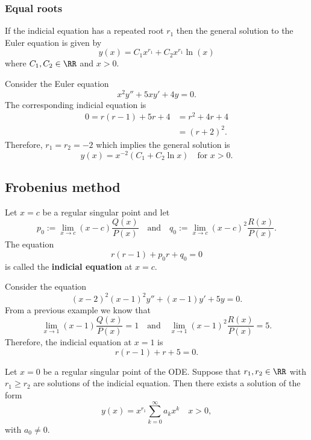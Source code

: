 \documentclass[12pt, a4paper]{article}
\begin{document}
\subsubsection{Equal roots}

\begin{mdthm}
    If the indicial equation has a repeated root \(r_1\) then the general solution to the Euler equation is given by
    \[y(x)=C_1 x^{r_1}+C_2 x^{r_1} \ln(x)\]
    where \(C_1,C_2 \in \RR\) and \(x>0\).
\end{mdthm}

\begin{example}
    Consider the Euler equation 
    \[x^2y''+5xy'+4y=0.\]
    The corresponding indicial equation is 
    \[\begin{aligned}
        0= r(r-1)+5r+4 &= r^2+4r+4 \\
        &= (r+2)^2.
    \end{aligned}\]
    Therefore, \(r_1=r_2=-2\) which implies the general solution is 
    \[y(x)=x^{-2}(C_1+C_2\ln x) \quad \text{for } x>0.\]
\end{example}

\subsection{Frobenius method}

\begin{definition}
    Let \(x=c\) be a regular singular point and let 
    \[p_0 := \lim_{x\to c}(x-c) \frac{Q(x)}{P(x)} \quad \text{and} \quad q_0:= \lim_{x\to c}(x-c)^2 \frac{R(x)}{P(x)}.\]
    The equation 
    \[r(r-1)+p_0r+q_0=0\]
    is called the \textbf{indicial equation} at \(x=c\).
\end{definition}

\begin{example}
    Consider the equation
    \[(x-2)^2(x-1)^2y''+(x-1)y'+5y=0.\]
    From a previous example we know that 
    \[\lim_{x \to 1}(x-1)\frac{Q(x)}{P(x)} =1 \quad \text{and} \quad \lim_{x\to 1} (x-1)^2\frac{R(x)}{P(x)}=5.\]
    Therefore, the indicial equation at \(x=1\) is 
    \[r(r-1)+r+5=0.\]
\end{example}

\begin{mdthm}
    Let \(x=0\) be a regular singular point of the ODE. Suppose that \(r_1,r_2 \in \RR\) with \(r_1 \geq r_2\) are solutions of the indicial equation. Then there exists a solution of the form 
    \[y(x) = x^{r_1} \sum_{k=0}^{\infty} a_k x^k \quad x>0,\]
    with \(a_0 \neq 0.\)
\end{mdthm}
\end{document}

